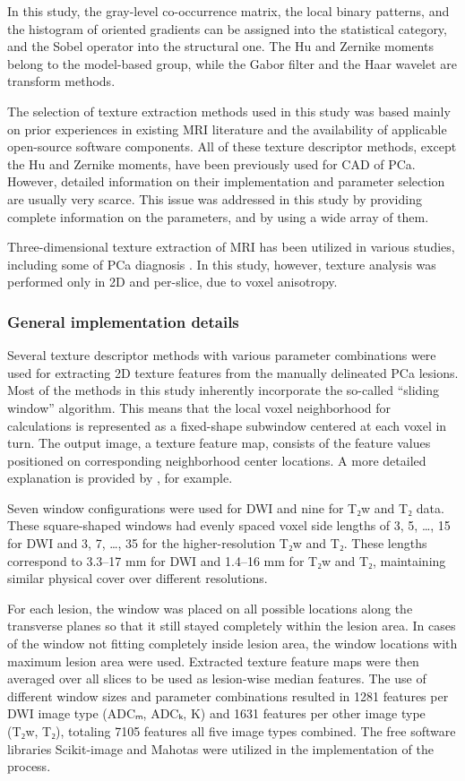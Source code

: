 In this study, the gray-level co-occurrence matrix, the local binary patterns,
and the histogram of oriented gradients can be assigned into the statistical
category, and the Sobel operator into the structural one. The Hu and Zernike
moments belong to the model-based group, while the Gabor filter and the Haar
wavelet are transform methods.

The selection of texture extraction methods used in this study was based mainly
on prior experiences in existing MRI literature \citep{Castellano2004,
Lemaitre2015} and the availability of applicable open-source software
components. All of these texture descriptor methods, except the Hu and Zernike
moments, have been previously used for CAD of PCa. However, detailed information
on their implementation and parameter selection are usually very scarce. This
issue was addressed in this study by providing complete information on the
parameters, and by using a wide array of them.

Three-dimensional texture extraction of MRI has been utilized in various
studies, including some of PCa diagnosis \citep{Depeursinge2014}. In this study,
however, texture analysis was performed only in 2D and per-slice, due to voxel
anisotropy.

\subsubsection{General implementation details}

Several texture descriptor methods with various parameter combinations were used
for extracting 2D texture features from the manually delineated PCa lesions.
Most of the methods in this study inherently incorporate the so-called ``sliding
window'' algorithm. This means that the local voxel neighborhood for
calculations is represented as a fixed-shape subwindow centered at each voxel in
turn. The output image, a texture feature map, consists of the feature values
positioned on corresponding neighborhood center locations. A more detailed
explanation is provided by \citet{Clausi2002Rapid}, for example.

Seven window configurations were used for DWI and nine for T₂w and T₂
data. These square-shaped windows had evenly spaced voxel side lengths of 3, 5,
…, 15 for DWI and 3, 7, …, 35 for the higher-resolution T₂w and T₂. These
lengths correspond to 3.3--17 mm for DWI and 1.4--16 mm for T₂w and T₂,
maintaining similar physical cover over different resolutions.

For each lesion, the window was placed on all possible locations along the
transverse planes so that it still stayed completely within the lesion area. In
cases of the window not fitting completely inside lesion area, the window
locations with maximum lesion area were used. Extracted texture feature maps
were then averaged over all slices to be used as lesion-wise median features.
The use of different window sizes and parameter combinations resulted in 1281
features per DWI image type (ADCₘ, ADCₖ, K) and 1631 features per other image
type (T₂w, T₂), totaling 7105 features all five image types combined. The free
software libraries Scikit-image \citep{VanderWalt2014} and Mahotas
\citep{Coelho2013} were utilized in the implementation of the process.

